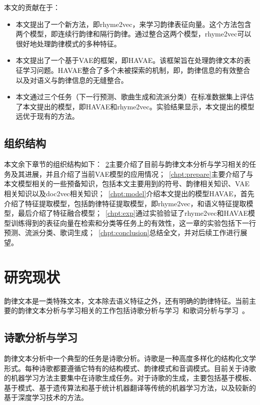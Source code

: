 本文的贡献在于：
\begin{itemize}
  \item 本文提出了一个新方法，即rhyme2vec，来学习韵律表征向量。这个方法包含两个模型，即连续行韵律和隔行韵律。通过整合这两个模型，rhyme2vec可以很好地处理韵律模式的多种特征。
  \item 本文提出了一个基于VAE的框架，即HAVAE。该框架旨在处理韵律文本的表征学习问题。HAVAE整合了多个未被探索的机制，即，韵律信息的有效整合以及对语义与韵律信息的无缝整合。
  \item 本文通过三个任务（下一行预测、歌曲生成和流派分类）在标准数据集上评估了本文提出的模型，即HAVAE和rhyme2vec。实验结果显示，本文提出的模型远优于现有的方法。
\end{itemize}

\section{组织结构}
本文余下章节的组织结构如下：~\ref{chpt:relat}主要介绍了目前与韵律文本分析与学习相关的任务及其进展，并且介绍了当前VAE模型的应用情况；~\ref{chpt:prepare}主要介绍了与本文模型相关的一些预备知识，包括本文主要用到的符号、韵律相关知识、VAE相关知识以及doc2vec相关知识；~\ref{chpt:model}介绍本文提出的模型HAVAE，首先介绍了特征提取模型，包括韵律特征提取模型，即rhyme2vec，和语义特征提取模型，最后介绍了特征融合模型；~\ref{chpt:exp}通过实验验证了rhyme2vec和HAVAE模型训练得到的表征向量在检索和分类等任务上的有效性，这一章的实验包括下一行预测、流派分类、歌词生成；~\ref{chpt:conclusion}总结全文，并对后续工作进行展望。\par

\chapter{研究现状} \label{chpt:relat}
韵律文本是一类特殊文本，文本除去语义特征之外，还有明确的韵律特征。当前主要的韵律文本分析与学习相关的工作包括诗歌分析与学习~\cite{oliveira2012poetryme,kurzweil2001ray,jiang2015jiyu,he2012generating,mikolov2010recurrent,zhang2014chinese}和歌词分析与学习~\cite{hu2009lyric,he2008language,hirjee2009automatic,wu2013learning}。

\section{诗歌分析与学习}
韵律文本分析中一个典型的任务是诗歌分析。诗歌是一种高度多样化的结构化文学形式。每种诗歌都要遵循它特有的结构模式、韵律模式和音调模式。目前关于诗歌的机器学习方法主要集中在诗歌生成任务。对于诗歌的生成，主要包括基于模板、基于模式、基于遗传算法和基于统计机器翻译等传统的机器学习方法，以及较新的基于深度学习技术的方法。\par


